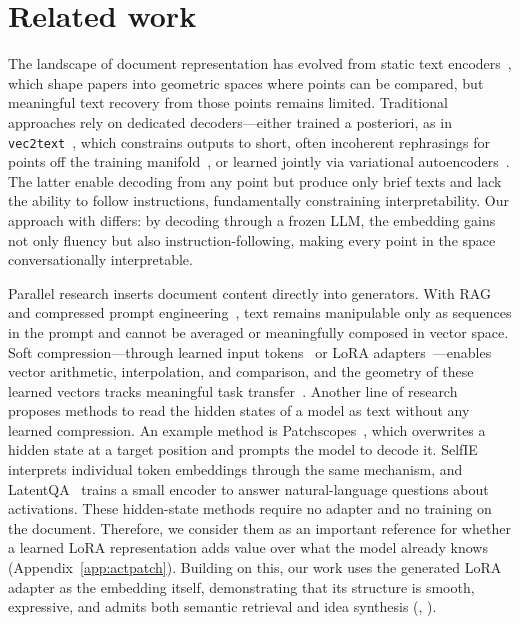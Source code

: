 \section{Related work}
\label{sec:related}

The landscape of document representation has evolved from static text encoders~\citep{reimers2019sbert,su2023instructor,cohan2020specter,singh2023scirepeval}, which shape papers into geometric spaces where points can be compared, but meaningful text recovery from those points remains limited. Traditional approaches rely on dedicated decoders---either trained a posteriori, as in \texttt{vec2text}~\citep{morris2023vec2text}, which constrains outputs to short, often incoherent rephrasings for points off the training manifold~\citep{kuratov2025cramming}, or learned jointly via variational autoencoders~\citep{bowman2016generating,li2020optimus,gomez2018automatic}. The latter enable decoding from any point but produce only brief texts and lack the ability to follow instructions, fundamentally constraining interpretability. Our approach with \doctolora differs: by decoding through a frozen LLM, the embedding gains not only fluency but also instruction-following, making every point in the space conversationally interpretable.

Parallel research inserts document content directly into generators. With RAG~\citep{lewis2020rag} and compressed prompt engineering~\citep{jiang2023llmlingua,li2023selective,xu2024recomp}, text remains manipulable only as sequences in the prompt and cannot be averaged or meaningfully composed in vector space. Soft compression---through learned input tokens~\citep{lester2021power,li2021prefix,mu2023gist,chevalier2023autocompressor,ge2024icae,li2024fivehundredx,rau2024cocom,cheng2024xrag} or LoRA adapters~\citep{chen2025ga,su2025parametricrag,sakana2024doc2lora}---enables vector arithmetic, interpolation, and comparison, and the geometry of these learned vectors tracks meaningful task transfer~\citep{vu2022spot}. Another line of research proposes methods to read the hidden states of a model as text without any learned compression. An example method is Patchscopes~\citep{ghandeharioun2024patchscopes}, which overwrites a hidden state at a target position and prompts the model to decode it.
SelfIE~\citep{chen2024selfie} interprets individual token embeddings through the same mechanism, and LatentQA~\citep{pan2024latentqa} trains a small encoder to answer natural-language questions about activations. These hidden-state methods require no adapter and no training on the document. Therefore, we consider them as an important reference for whether a learned LoRA representation adds value over what the model already knows (Appendix~\ref{app:actpatch}).
Building on this, our work uses the generated LoRA adapter as the embedding itself, demonstrating that its structure is smooth, expressive, and admits both semantic retrieval and idea synthesis (, ).

